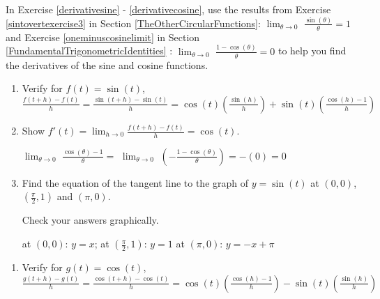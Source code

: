 \documentclass{ximera}
\begin{document}
\begin{question}
    
In Exercise \ref{derivativesine} - \ref{derivativecosine}, use the results from  Exercise \ref{sintovertexercise3} in Section \ref{TheOtherCircularFunctions}: $\lim_{\theta \rightarrow 0}$ $\frac{\sin(\theta)}{\theta} = 1$ and Exercise \ref{oneminuscosinelimit} in Section \ref{FundamentalTrigonometricIdentities} :   $\lim_{\theta \rightarrow 0}$ $\frac{1 - \cos(\theta)}{\theta} = 0$ to help you find the derivatives of the sine and cosine functions.

\begin{problem}\label{derivativesine}
\begin{enumerate}  
    \item  Verify for $f(t) = \sin(t)$, $\frac{f(t+h) - f(t)}{h} = \frac{\sin(t + h) - \sin(t)}{h} = \cos(t) \left(\frac{\sin(h)}{h} \right) + \sin(t) \left( \frac{\cos(h) - 1}{h} \right)$

\item  Show $f'(t) = \lim_{h \rightarrow 0} \frac{f(t+h) - f(t)}{h} = \cos(t)$.

\begin{hint}
$\lim_{\theta \rightarrow 0}$ $\frac{\cos(\theta) - 1}{\theta} =$ $\lim_{\theta \rightarrow 0}$ $\left(-\frac{1 - \cos(\theta)}{\theta}\right) = - (0) = 0$
\end{hint}

\item  Find the equation of the tangent line to the graph of $y = \sin(t)$ at $(0,0)$, $\left(\frac{\pi}{2}, 1\right)$ and $(\pi, 0)$.  

Check your answers graphically.

\begin{solution}
at $(0,0)$:  $y = x$;  at $\left(\frac{\pi}{2}, 1\right)$:  $y = 1$   at $(\pi, 0)$:  $y = -x + \pi$
\end{solution}

\end{enumerate}
\end{problem}

\begin{problem}\label{derivativecosine}

\begin{enumerate} 
\item   Verify for $g(t) = \cos(t)$, $\frac{g(t+h) - g(t)}{h} = \frac{\cos(t + h) - \cos(t)}{h} = \cos(t) \left( \frac{\cos(h) - 1}{h} \right) - \sin(t) \left(\frac{\sin(h)}{h} \right)$


\end{enumerate}
\end{problem}
\end{question}
\end{document}
